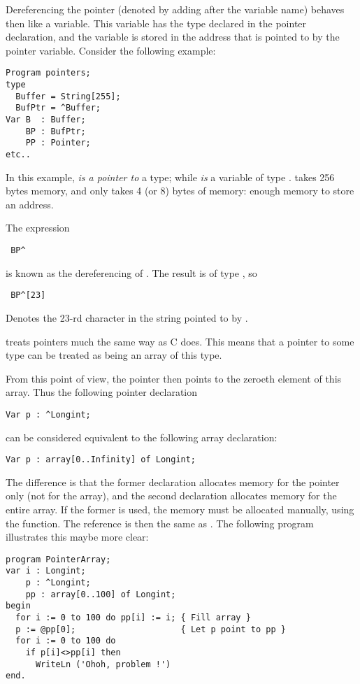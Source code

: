 Dereferencing the pointer (denoted by adding \var{\^{}} after the variable
name) behaves then like a variable. This variable has the type declared in
the pointer declaration, and the variable is stored in the address that is
pointed to by the pointer variable.
Consider the following example:
\begin{verbatim}
Program pointers;
type
  Buffer = String[255];
  BufPtr = ^Buffer;
Var B  : Buffer;
    BP : BufPtr;
    PP : Pointer;
etc..
\end{verbatim}
In this example,  {\em is a pointer to} a  type; while 
{\em is} a variable of type .  takes 256 bytes memory,
and  only takes 4 (or 8) bytes of memory: enough memory to store an
address.

The expression
\begin{verbatim}
 BP^
\end{verbatim}
is known as the dereferencing of . The result is of type , so
\begin{verbatim}
 BP^[23]
\end{verbatim}
Denotes the 23-rd character in the string pointed to by .
\begin{remark} \fpc treats pointers much the same way as C does. This means
that a pointer to some type can be treated as being an array of this type.

From this point of view, the pointer then points to the zeroeth element of this array. 
Thus the following pointer declaration
\begin{verbatim}
Var p : ^Longint;
\end{verbatim}
can be considered equivalent to the following array declaration:
\begin{verbatim}
Var p : array[0..Infinity] of Longint;
\end{verbatim}
The difference is that the former declaration allocates memory for the
pointer only (not for the array), and the second declaration allocates
memory for the entire array. If the former is used, the memory must be
allocated manually, using the  function.
The reference  is then the same as . The following program
illustrates this maybe more clear:
\begin{verbatim}
program PointerArray;
var i : Longint;
    p : ^Longint;
    pp : array[0..100] of Longint;
begin
  for i := 0 to 100 do pp[i] := i; { Fill array }
  p := @pp[0];                     { Let p point to pp }
  for i := 0 to 100 do
    if p[i]<>pp[i] then
      WriteLn ('Ohoh, problem !')
end.
\end{verbatim}
\end{remark}
